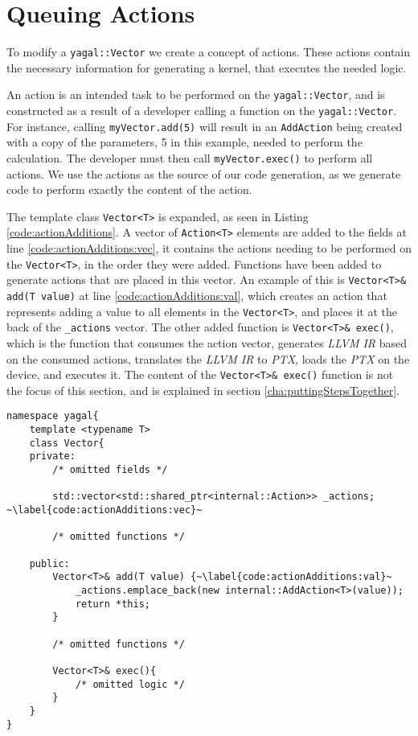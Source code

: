 \section{Queuing Actions} \label{cha:queueingActions}
To modify a \texttt{yagal::Vector} we create a concept of actions. These actions contain the necessary information for generating a kernel, that executes the needed logic.

An action is an intended task to be performed on the \texttt{yagal::Vector}, and is constructed as a result of a developer calling a function on the \texttt{yagal::Vector}. For instance, calling \texttt{myVector.add(5)} will result in an \texttt{AddAction} being created with a copy of the parameters, 5 in this example, needed to perform the calculation. The developer must then call \texttt{myVector.exec()} to perform all actions. We use the actions as the source of our code generation, as we generate code to perform exactly the content of the action.

The template class \texttt{Vector<T>} is expanded, as seen in Listing \ref{code:actionAdditions}. A vector of \texttt{Action<T>} elements are added to the fields at line \ref{code:actionAdditions:vec}, it contains the actions needing to be performed on the \texttt{Vector<T>}, in the order they were added. Functions have been added to generate actions that are placed in this vector. An example of this is \texttt{Vector<T>\& add(T value)} at line \ref{code:actionAdditions:val}, which creates an action that represents adding a value to all elements in the \texttt{Vector<T>}, and places it at the back of the \texttt{\_actions} vector. The other added function is \texttt{Vector<T>\& exec()}, which is the function that consumes the action vector, generates \textit{LLVM IR} based on the consumed actions, translates the \textit{LLVM IR} to \textit{PTX}, loads the \textit{PTX} on the device, and executes it. The content of the \texttt{Vector<T>\& exec()} function is not the focus of this section, and is explained in section \ref{cha:puttingStepsTogether}.

\begin{lstlisting}[caption={Vector<T> action additions}, label={code:actionAdditions}]
namespace yagal{
    template <typename T>
    class Vector{
    private:
        /* omitted fields */

        std::vector<std::shared_ptr<internal::Action>> _actions; ~\label{code:actionAdditions:vec}~

        /* omitted functions */
    
    public:
        Vector<T>& add(T value) {~\label{code:actionAdditions:val}~
            _actions.emplace_back(new internal::AddAction<T>(value));
            return *this;
        }
        
        /* omitted functions */

        Vector<T>& exec(){
            /* omitted logic */
        }
    }
}
\end{lstlisting}

